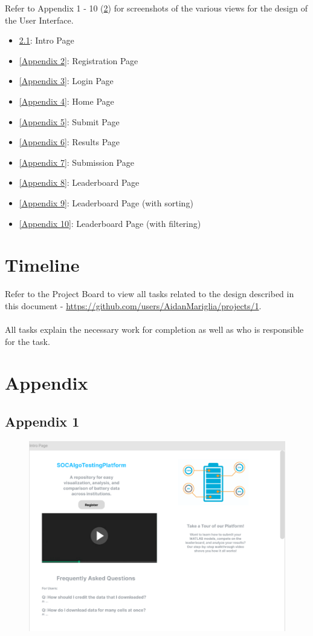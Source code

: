 \documentclass[12pt, titlepage]{article}
\begin{document}
Refer to Appendix 1 - 10 (\ref{Appendix}) for screenshots of the various views for the design of the User Interface.

\begin{itemize}
    \item \ref{Appendix 1}: Intro Page
    \item \ref{Appendix 2}: Registration Page
    \item \ref{Appendix 3}: Login Page
    \item \ref{Appendix 4}: Home Page
    \item \ref{Appendix 5}: Submit Page
    \item \ref{Appendix 6}: Results Page
    \item \ref{Appendix 7}: Submission Page
    \item \ref{Appendix 8}: Leaderboard Page
    \item \ref{Appendix 9}: Leaderboard Page (with sorting)
    \item \ref{Appendix 10}: Leaderboard Page (with filtering)
\end{itemize}

\section{Timeline} \label{Timeline}

Refer to the Project Board to view all tasks related to the design described in this document - \url{https://github.com/users/AidanMariglia/projects/1}.\\ \\ All tasks explain the necessary work for completion as well as who is responsible for the task.

\section{Appendix}\label{Appendix}

\subsection{Appendix 1} \label{Appendix 1}
\begin{figure}[H]
    \centering
    \includegraphics[width=1\linewidth]{Design/SoftArchitecture/Interface/Intro.png}
\end{figure}
\end{document}
